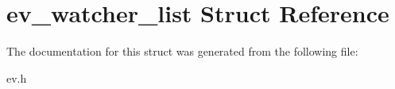 \hypertarget{structev__watcher__list}{}\section{ev\+\_\+watcher\+\_\+list Struct Reference}
\label{structev__watcher__list}


The documentation for this struct was generated from the following file\+:\begin{DoxyCompactItemize}
\item 
ev.\+h\end{DoxyCompactItemize}
